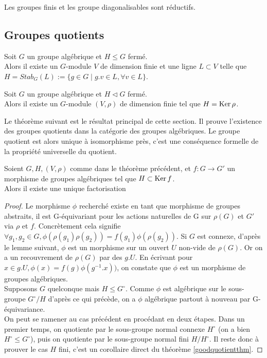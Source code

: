 \begin{ex}
Les groupes finis et les groupe diagonalisables sont réductifs.
\end{ex}

\subsection{Groupes quotients}
\begin{thm}
Soit $G$ un groupe algébrique et $H\leq G$ fermé. \\Alors il existe un $G$-module $V$ de dimension finie et une ligne $L\subset V$ telle que $H=Stab_G(L):=\lbrace g\in G\mid g.v\in L,\forall v\in L\rbrace$.
\end{thm}

\begin{thm}
Soit $G$ un groupe algébrique et $H\lhd G$ fermé. \\Alors il existe un $G$-module $(V, \rho)$ de dimension finie tel que $H=\operatorname{Ker}{\rho}$.
\end{thm}

Le théorème suivant est le résultat principal de cette section. Il prouve l'existence des groupes quotients dans la catégorie des groupes algébriques. Le groupe quotient est alors unique à isomorphisme près, c'est une conséquence formelle de la propriété universelle du quotient.

\begin{thm}[Car. 0]\label{groupequotient}
Soient $G, H, (V, \rho)$ comme dans le théorème précédent, et $f:G \rightarrow G'$ un morphisme de groupes algébriques tel que $H\subset \operatorname{Ker} f$.\\
Alors il existe une unique factorisation 	
\end{thm}
\begin{proof}
	Le morphisme $\phi$ recherché existe en tant que morphisme de groupes abstraits, il est G-équivariant pour les actions naturelles de G sur $\rho(G)$ et $G'$ via $\rho$ et $f$. Concrètement cela signifie $\forall g_1, g_2 \in G, \phi(\rho(g_1)\rho(g_2))=f(g_1)\phi(\rho(g_2))$. Si $G$ est connexe, d'après le lemme suivant, $\phi$ est un morphisme sur un ouvert $U$ non-vide de $\rho(G)$. Or on a un recouvrement de $\rho(G)$ par des $g.U$. En écrivant pour $x\in g.U,  \phi(x)=f(g)\phi(g^{-1}.x))$, on constate que $\phi$ est un morphisme de groupes algébriques.
	\\Supposons $G$ quelconque mais $H\leq G^\circ$. Comme $\phi$ est algébrique sur le sous-groupe $G^\circ/H$ d'après ce qui précède, on a $\phi$ algébrique partout à nouveau par G-équivariance.\\
	On peut se ramener au cas précédent en procédant en deux étapes. Dans un premier temps, on quotiente par le sous-groupe normal connexe $H^\circ$ (on a bien $H^\circ\leq G^\circ$), puis on quotiente par le sous-groupe normal fini $H/H^\circ$. Il reste donc à prouver le cas $H$ fini, c'est un corollaire direct du théorème \ref{goodquotientthm}.
\end{proof}

